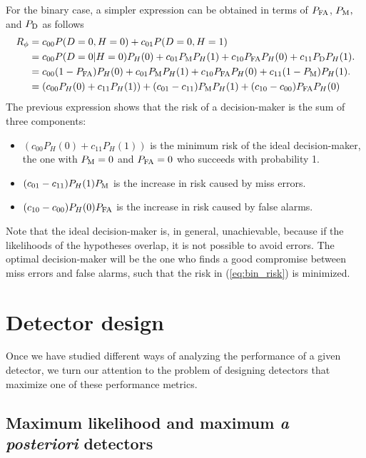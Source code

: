 For the binary case, a simpler expression can be obtained in terms of $P_{\text{FA}}$, $P_{\text{M}},$ and $P_{\text{D}}$ as follows
\begin{align}
\label{eq:bin_risk}
R_\phi 
    &= c_{00} P(D=0, H=0) + c_{01} P(D=0,H=1)                    \nonumber\\
    &= c_{00} P(D=0|H=0) P_H(0) + c_{01} P_{\text{M}} P_H(1) + c_{10} P_{\text{FA}} P_H(0) + c_{11} P_{\text{D}} P_H(1) .      \nonumber\\
    &= c_{00} (1-P_{\text{FA}}) P_H(0) + c_{01} P_{\text{M}} P_H(1) + c_{10} P_{\text{FA}} P_H(0) + c_{11} (1-P_{\text{M}}) P_H(1) .\nonumber\\
    &= \left(c_{00} P_H(0) + c_{11} P_H(1)\right) + (c_{01}- c_{11}) P_{\text{M}} P_H(1) + (c_{10}-c_{00}) P_{\text{FA}} P_H(0) 
\end{align}
The previous expression shows that the risk of a decision-maker is the sum of three components:
\begin{itemize}
\item $(c_{00} P_H(0) + c_{11} P_H(1))$ is the minimum risk of the ideal decision-maker, the one with $P_{\text{M}}=0$ and $P_{\text{FA}}=0$ who succeeds with probability 1.
\item $(c_{01}-c_{11}) P_H(1) P_{\text{M}}$ is the increase in risk caused by miss errors.
\item $(c_{10}-c_{00}) P_H(0) P_{\text{FA}}$ is the increase in risk caused by false alarms.
\end{itemize}
Note that the ideal decision-maker is, in general, unachievable, because if the likelihoods of the hypotheses overlap, it is not possible to avoid errors. The optimal decision-maker will be the one who finds a good compromise between miss errors and false alarms, such that the risk in (\ref{eq:bin_risk}) is minimized.


\section{Detector design}
\label{subsec:design}

Once we have studied different ways of analyzing the performance of a given detector, we turn our attention to the problem of designing detectors that maximize one of these performance metrics.

\subsection{Maximum likelihood and maximum \emph{a posteriori} detectors}

